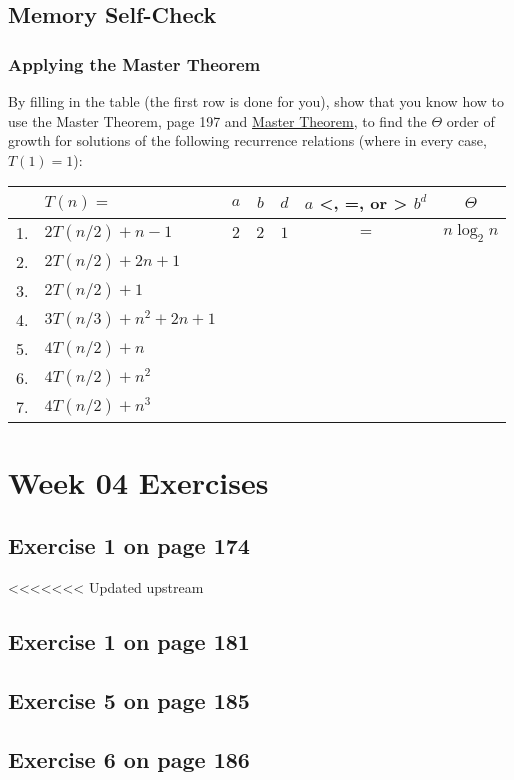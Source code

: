 \documentclass[12pt]{amsart}
\begin{document}
\subsection{Memory Self-Check}

\subsubsection{Applying the Master Theorem}


By filling in the table (the first row is done for you), show that you know
  how to use the Master Theorem, page 197 and \href{run:../support_files/master_theorem.pdf}{Master Theorem}, to find the $\Theta$ order of growth for solutions of the following recurrence relations (where in every case, $T(1) = 1$):
  \\
\begin{tabular}{|c|l|c|c|c|c|c|}
\hline
    &$T(n) =$           & $a$ & $b$ & $d$ & $a$ <, =, or > $b^d$ & $\Theta$ \\
\hline
1. & $2T(n/2)+n-1$ & $2$ & $2$ & $1$ & $=$ & $n\log_2 n$ \\
\hline
2. & $2T(n/2)+2n+1$ &  &  & & &  \\
\hline
3. & $2T(n/2)+1$ &  &  & & &  \\
\hline
4. & $3T(n/3)+n^2+2n+1$ &  &  & & &  \\
\hline
5. & $4T(n/2)+n$ &  &  & & &  \\
\hline
6. & $4T(n/2)+n^2$ &  &  & & &  \\
\hline
7. & $4T(n/2)+n^3$ &  &  & & &  \\
\hline
\end{tabular}
 \section{Week 04 Exercises}
\subsection{ Exercise 1 on page 174} 
<<<<<<< Updated upstream
\subsection{Exercise 1 on page 181} 
\subsection{Exercise 5 on page 185} 
\subsection{Exercise 6 on page 186} 
\end{document}
